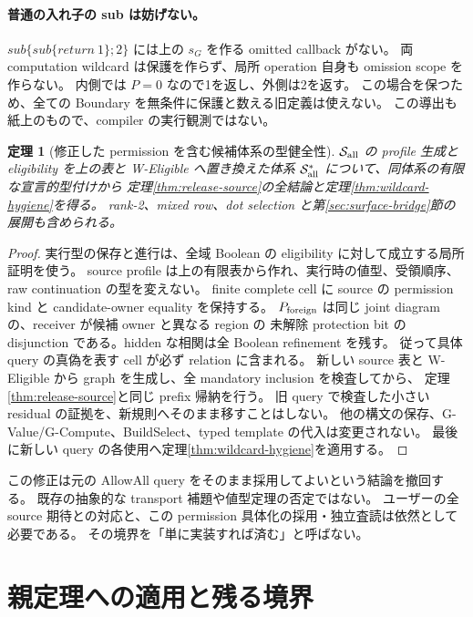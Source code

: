 \documentclass[11pt,a4paper]{article}
\newtheorem{theorem}[definition]{定理}
\newcommand{\Src}{\mathcal S}
\begin{document}
\paragraph{普通の入れ子の sub は妨げない。}
\(sub\{sub\{return\ 1\};2\}\) には上の \(s_G\) を作る omitted callback がない。
両 computation wildcard は保護を作らず、局所 operation 自身も omission scope を作らない。
内側では \(P=0\) なので1を返し、外側は2を返す。
この場合を保つため、全ての Boundary を無条件に保護と数える旧定義は使えない。
この導出も紙上のもので、compiler の実行観測ではない。

\begin{theorem}[修正した permission を含む候補体系の型健全性]
\label{thm:repaired-source}
\(\Src_{\rm all}\) の profile 生成と eligibility を上の表と W-Eligible へ置き換えた体系
\(\Src^*_{\rm all}\) について、同体系の有限な宣言的型付けから
定理\ref{thm:release-source}の全結論と定理\ref{thm:wildcard-hygiene}を得る。
rank-2、mixed row、dot selection と第\ref{sec:surface-bridge}節の展開も含められる。
\end{theorem}
\begin{proof}
実行型の保存と進行は、全域 Boolean の eligibility に対して成立する局所証明を使う。
source profile は上の有限表から作れ、実行時の値型、受領順序、raw continuation の型を変えない。
finite complete cell に source の permission kind と candidate-owner equality を保持する。
\(P_{\rm foreign}\) は同じ joint diagram の、receiver が候補 owner と異なる region の
未解除 protection bit の disjunction である。hidden な相関は全 Boolean refinement を残す。
従って具体 query の真偽を表す cell が必ず relation に含まれる。
新しい source 表と W-Eligible から graph を生成し、全 mandatory inclusion を検査してから、
定理\ref{thm:release-source}と同じ prefix 帰納を行う。
旧 query で検査した小さい residual の証拠を、新規則へそのまま移すことはしない。
他の構文の保存、G-Value/G-Compute、BuildSelect、typed template の代入は変更されない。
最後に新しい query の各使用へ定理\ref{thm:wildcard-hygiene}を適用する。
\end{proof}

この修正は元の AllowAll query をそのまま採用してよいという結論を撤回する。
既存の抽象的な transport 補題や値型定理の否定ではない。
ユーザーの全 source 期待との対応と、この permission 具体化の採用・独立査読は依然として必要である。
その境界を「単に実装すれば済む」と呼ばない。

\section{親定理への適用と残る境界}
\label{sec:remaining}
\end{document}
